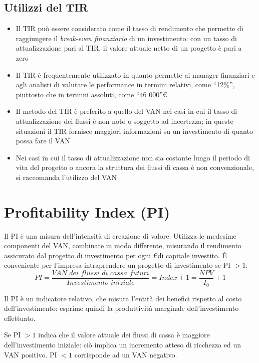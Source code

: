 \subsection{Utilizzi del TIR}
\begin{itemize}
	\item Il TIR può essere considerato come il tasso di rendimento che permette di raggiungere il \emph{break-even
	finanziario} di un investimento: con un tasso di attualizzazione pari al TIR, il valore attuale netto di un
	progetto è pari a zero
	\item Il TIR è frequentemente utilizzato in quanto permette ai manager finanziari e agli analisti di valutare le
	performance in termini relativi, come ``12\%'', piuttosto che in termini assoluti, come ``46 000''\euro
	\item Il metodo del TIR è preferito a quello del VAN nei casi in cui il tasso di attualizzazione dei flussi è
	non noto o soggetto ad incertezza; in queste situazioni il TIR fornisce maggiori informazioni su un
	investimento di quanto possa fare il VAN
	\item Nei casi in cui il tasso di attualizzazione non sia costante lungo il periodo di vita del progetto o ancora la
	struttura dei flussi di cassa è non convenzionale, si raccomanda l’utilizzo del VAN
\end{itemize}

\section{Profitability Index (PI)}

Il PI è una misura dell’intensità di creazione di valore. Utilizza le medesime componenti del VAN,
combinate in modo differente, misurando il rendimento assicurato dal progetto di investimento per
ogni \euro di capitale investito. \`E conveniente per l’impresa intraprendere un progetto di investimento se PI $> 1$:
\[
PI = \frac{\textit{VAN dei flussi di cassa futuri}}{\textit{Investimento iniziale}} = \textit{Index} + 1 = \frac{NPV}{I_0} + 1
\]

Il PI è un indicatore relativo, che misura l’entità dei benefici rispetto al costo dell’investimento: esprime
quindi la produttività marginale dell’investimento effettuato.

Se PI $> 1$ indica che il valore attuale dei flussi di cassa è maggiore dell’investimento iniziale: ciò implica un incremento
atteso di ricchezza ed un VAN positivo. PI $< 1$ corrisponde ad un VAN negativo.

